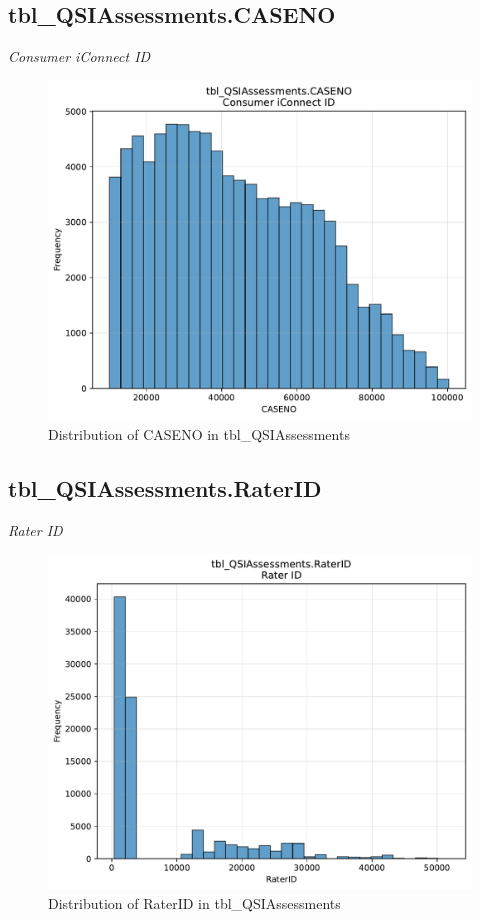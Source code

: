 \subsection{tbl\_QSIAssessments.CASENO}
\textit{Consumer iConnect ID}

\begin{figure}[htbp]
\centering
\includegraphics[width=\textwidth]{figures/dbo_tbl_QSIAssessments_CASENO.pdf}
\caption{Distribution of CASENO in tbl\_QSIAssessments}
\end{figure}\newpage

\subsection{tbl\_QSIAssessments.RaterID}
\textit{Rater ID}

\begin{figure}[htbp]
\centering
\includegraphics[width=\textwidth]{figures/dbo_tbl_QSIAssessments_RaterID.pdf}
\caption{Distribution of RaterID in tbl\_QSIAssessments}
\end{figure}\newpage

